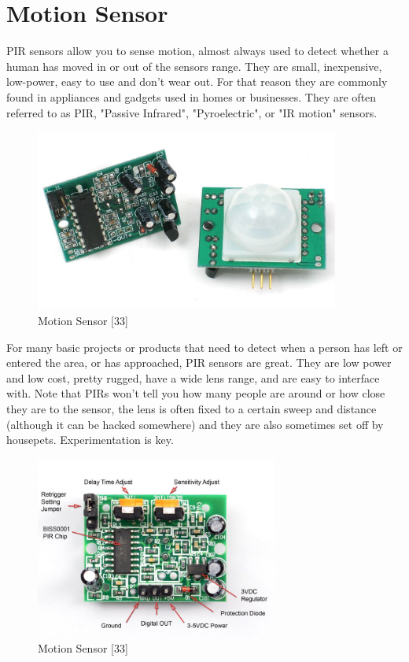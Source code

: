 \documentclass[twoside,a4paper,16pt]{book}
\begin{document}
{{\section{Motion Sensor }
PIR sensors allow you to sense motion, almost always used to detect whether a human has moved in or out of the sensors range. They are small, inexpensive, low-power, easy to use and don't wear out. For that reason they are commonly found in appliances and gadgets used in homes or businesses. They are often referred to as PIR, "Passive Infrared", "Pyroelectric", or "IR motion" sensors.
\begin{figure}[ht!]
	\begin{center}
		\includegraphics[width=10.0cm]{13.jpg}
		\caption{Motion Sensor [33]}
	\end{center}
\end{figure}
For many basic projects or products that need to detect when a person has left or entered the area, or has approached, PIR sensors are great. They are low power and low cost, pretty rugged, have a wide lens range, and are easy to interface with. Note that PIRs won't tell you how many people are around or how close they are to the sensor, the lens is often fixed to a certain sweep and distance (although it can be hacked somewhere) and they are also sometimes set off by housepets. Experimentation is key.
\begin{figure}[ht!]
	\begin{center}
		\includegraphics[width=8.0cm]{14.jpg}
		\caption{Motion Sensor [33]}
	\end{center}
\end{figure}
}}
\end{document}
